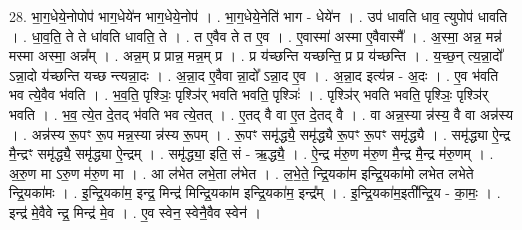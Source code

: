 \documentclass[17pt]{extarticle}
\begin{document}
28. भा॒ग॒धेये॒नोपोप॑ भाग॒धेये॑न भाग॒धेये॒नोप॑ । . भा॒ग॒धेये॒नेति॑ भाग - धेये॑न । . उप॑ धावति धाव॒ त्युपोप॑ धावति । . धा॒व॒ति॒ ते ते धा॑वति धावति॒ ते । . त ए॒वैव ते त ए॒व । . ए॒वास्मा॑ अस्मा ए॒वैवास्मै᳚ । . अ॒स्मा॒ अन्न॒ मन्न॑ मस्मा अस्मा॒ अन्न᳚म् । . अन्न॒म् प्र प्रान्न॒ मन्न॒म् प्र । . प्र य॑च्छन्ति यच्छन्ति॒ प्र प्र य॑च्छन्ति । . य॒च्छ॒न् त्य॒न्ना॒दो᳚ ऽन्ना॒दो य॑च्छन्ति यच्छ न्त्यन्ना॒दः । . अ॒न्ना॒द ए॒वैवा न्ना॒दो᳚ ऽन्ना॒द ए॒व । . अ॒न्ना॒द इत्य॑न्न - अ॒दः । . ए॒व भ॑वति भव त्ये॒वैव भ॑वति । . भ॒व॒ति॒ पृश्ञिः॒ पृश्ञि॑र् भवति भवति॒ पृश्ञिः॑ । . पृश्ञि॑र् भवति भवति॒ पृश्ञिः॒ पृश्ञि॑र् भवति । . भ॒व॒ त्ये॒त दे॒तद् भ॑वति भव त्ये॒तत् । . ए॒तद् वै वा ए॒त दे॒तद् वै । . वा अन्न॒स्या न्न॑स्य॒ वै वा अन्न॑स्य । . अन्न॑स्य रू॒पꣳ रू॒प मन्न॒स्या न्न॑स्य रू॒पम् । . रू॒पꣳ समृ॑द्ध्यै॒ समृ॑द्ध्यै रू॒पꣳ रू॒पꣳ समृ॑द्ध्यै । . समृ॑द्ध्या ऐ॒न्द्र मै॒न्द्रꣳ समृ॑द्ध्यै॒ समृ॑द्ध्या ऐ॒न्द्रम् । . समृ॑द्ध्या॒ इति॒ सं - ऋ॒द्ध्यै॒ । . ऐ॒न्द्र म॑रु॒ण म॑रु॒ण मै॒न्द्र मै॒न्द्र म॑रु॒णम् । . अ॒रु॒ण मा ऽरु॒ण म॑रु॒ण मा । . आ ल॑भेत लभे॒ता ल॑भेत । . ल॒भे॒ते॒ न्द्रि॒यका॑म इन्द्रि॒यका॑मो लभेत लभेते न्द्रि॒यका॑मः । . इ॒न्द्रि॒यका॑म॒ इन्द्र॒ मिन्द्र॑ मिन्द्रि॒यका॑म इन्द्रि॒यका॑म॒ इन्द्र᳚म् । . इ॒न्द्रि॒यका॑म॒इती᳚न्द्रि॒य - का॒मः॒ । . इन्द्र॑ मे॒वैवे न्द्र॒ मिन्द्र॑ मे॒व । . ए॒व स्वेन॒ स्वेनै॒वैव स्वेन॑ । \newline
\end{document}
